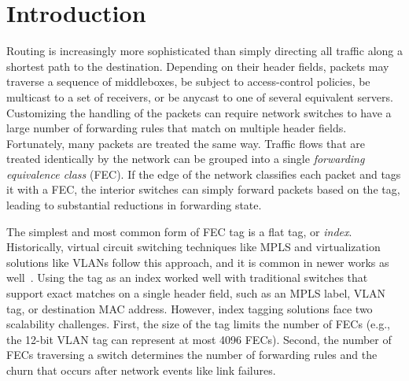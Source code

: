 \section{Introduction}
\label{sec:intro}
Routing is increasingly more sophisticated than simply directing all traffic along a shortest path to the destination.  Depending on their header fields, packets may traverse a sequence of middleboxes, be subject to access-control policies, be multicast to a set of receivers, or be anycast to one of several equivalent servers.  Customizing the handling of the packets can require network switches to have a large number of forwarding rules that match on multiple header fields.  Fortunately, many packets are treated the same way.  Traffic flows that are treated identically by the network can be grouped into a single \emph{forwarding equivalence class} (FEC). If the edge of the network classifies each packet and tags it with a FEC, the interior switches can simply forward packets based on the tag, leading to substantial reductions in forwarding state.

The simplest and most common form of FEC tag is a flat tag, or \emph{index}. Historically, virtual circuit switching techniques like MPLS and virtualization solutions like VLANs follow this approach, and it is common in newer works as well~\cite{flowtags,sdx}.  Using the tag as an index worked well with traditional switches that support exact matches on a single header field, such as an MPLS label, VLAN tag, or destination MAC address.  However, index tagging solutions face two scalability challenges.  First, the size of the tag limits the number of FECs (e.g., the 12-bit VLAN tag can represent at most 4096 FECs).  Second, the number of FECs traversing a switch determines the number of forwarding rules and the churn that occurs after network events like link failures.

